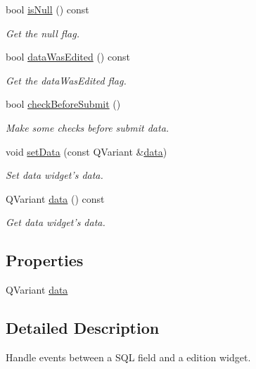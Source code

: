 \begin{DoxyCompactItemize}
bool \hyperlink{classmdt_sql_field_handler_a32c52fa21b4a0e2165e1fbbb8f7fe3b7}{is\-Null} () const 
\begin{DoxyCompactList}\small\item\em Get the null flag. \end{DoxyCompactList}\item 
bool \hyperlink{classmdt_sql_field_handler_a08ed5d8dde1447a5bc42af003551641f}{data\-Was\-Edited} () const 
\begin{DoxyCompactList}\small\item\em Get the data\-Was\-Edited flag. \end{DoxyCompactList}\item 
bool \hyperlink{classmdt_sql_field_handler_abb37a65b248a02a126676b45ee90789a}{check\-Before\-Submit} ()
\begin{DoxyCompactList}\small\item\em Make some checks before submit data. \end{DoxyCompactList}\item 
void \hyperlink{classmdt_sql_field_handler_a14478a0cd018cf2803dd41061c901aad}{set\-Data} (const Q\-Variant \&\hyperlink{classmdt_sql_field_handler_a87e0184853f31ac3236a6b05179192c8}{data})
\begin{DoxyCompactList}\small\item\em Set data widget's data. \end{DoxyCompactList}\item 
Q\-Variant \hyperlink{classmdt_sql_field_handler_a1ca9ec373a844a3dcf5f46807259171f}{data} () const 
\begin{DoxyCompactList}\small\item\em Get data widget's data. \end{DoxyCompactList}\end{DoxyCompactItemize}
\subsection*{Properties}
\begin{DoxyCompactItemize}
\item 
Q\-Variant \hyperlink{classmdt_sql_field_handler_a87e0184853f31ac3236a6b05179192c8}{data}
\end{DoxyCompactItemize}


\subsection{Detailed Description}
Handle events between a S\-Q\-L field and a edition widget. 

